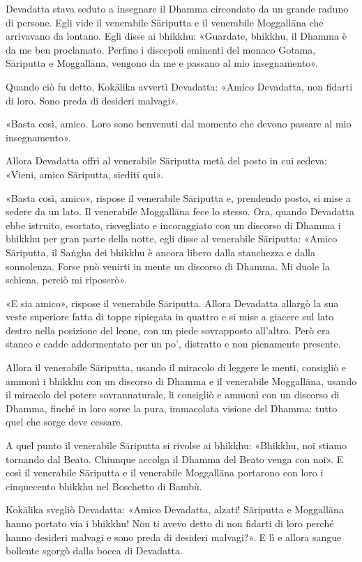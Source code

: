 Devadatta stava seduto a insegnare il Dhamma circondato da un grande raduno di
persone. Egli vide il venerabile Sāriputta e il venerabile Moggallāna che
arrivavano da lontano. Egli disse ai bhikkhu: «Guardate, bhikkhu, il Dhamma è da
me ben proclamato. Perfino i discepoli eminenti del monaco Gotama, Sāriputta e
Moggallāna, vengono da me e passano al mio insegnamento».

Quando ciò fu detto, Kokālika avvertì Devadatta: «Amico Devadatta, non fidarti
di loro. Sono preda di desideri malvagi».

«Basta così, amico. Loro sono benvenuti dal momento che devono passare al mio
insegnamento».

Allora Devadatta offrì al venerabile Sāriputta metà del posto in cui sedeva:
«Vieni, amico Sāriputta, siediti qui».

«Basta così, amico», rispose il venerabile Sāriputta e, prendendo posto, si mise
a sedere da un lato. Il venerabile Moggallāna fece lo stesso. Ora, quando
Devadatta ebbe istruito, esortato, risvegliato e incoraggiato con un discorso di
Dhamma i bhikkhu per gran parte della notte, egli disse al venerabile Sāriputta:
«Amico Sāriputta, il Saṅgha dei bhikkhu è ancora libero dalla stanchezza e dalla
sonnolenza. Forse può venirti in mente un discorso di Dhamma. Mi duole la
schiena, perciò mi riposerò».

«E sia amico», rispose il venerabile Sāriputta. Allora Devadatta allargò la sua
veste superiore fatta di toppe ripiegata in quattro e si mise a giacere sul lato
destro nella posizione del leone, con un piede sovrapposto all’altro. Però era
stanco e cadde addormentato per un po’, distratto e non pienamente presente.

Allora il venerabile Sāriputta, usando il miracolo di leggere le menti,
consigliò e ammonì i bhikkhu con un discorso di Dhamma e il venerabile
Moggallāna, usando il miracolo del potere sovrannaturale, li consigliò e ammonì
con un discorso di Dhamma, finché in loro sorse la pura, immacolata visione del
Dhamma: tutto quel che sorge deve cessare.

A quel punto il venerabile Sāriputta si rivolse ai bhikkhu: «Bhikkhu, noi stiamo
tornando dal Beato. Chiunque accolga il Dhamma del Beato venga con noi». E così
il venerabile Sāriputta e il venerabile Moggallāna portarono con loro i
cinquecento bhikkhu nel Boschetto di Bambù.

Kokālika svegliò Devadatta: «Amico Devadatta, alzati! Sāriputta e Moggallāna
hanno portato via i bhikkhu! Non ti avevo detto di non fidarti di loro perché
hanno desideri malvagi e sono preda di desideri malvagi?». E lì e allora sangue
bollente sgorgò dalla bocca di Devadatta.

